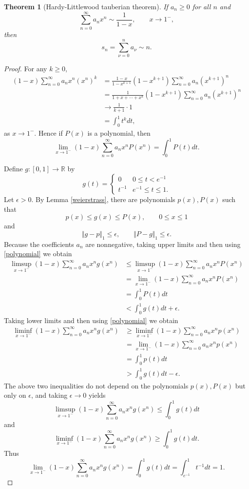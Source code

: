\documentclass{article}
\newcommand{\norm}[1]{\Vert #1 \Vert}
\newtheorem{theorem}{Theorem}
\begin{document}
\begin{theorem}[Hardy-Littlewood tauberian theorem]
If $a_n \geq 0$ for all $n$ and 
\[
\sum_{n=0}^\infty a_n x^n \sim \frac{1}{1-x}, \qquad x \to 1^-,
\]
then
\[
s_n = \sum_{\nu=0}^n a_\nu \sim n.
\]
\end{theorem}
\begin{proof}
For any $k \geq 0$,
\begin{align*}
(1-x)\sum_{n=0}^\infty a_n x^n (x^n)^k&=\frac{1-x}{1-x^{k+1}} (1-x^{k+1}) \sum_{n=0}^\infty a_n (x^{k+1})^n\\
&= \frac{1}{1+x+\cdots+x^k} (1-x^{k+1}) \sum_{n=0}^\infty a_n (x^{k+1})^n\\
&\to \frac{1}{k+1} \cdot 1\\
&= \int_0^1 t^k dt,
\end{align*}
as $x \to 1^-$. Hence if $P(x)$ is a polynomial, then
\begin{equation}
\lim_{x \to 1^-} (1-x) \sum_{n=0}^\infty a_n x^n P(x^n) = \int_0^1 P(t) dt.
\label{polynomial}
\end{equation}



Define $g:[0,1] \to \mathbb{R}$ by
\[
g(t) = 
\begin{cases}
0&0 \leq t <e^{-1}\\
t^{-1}&e^{-1} \leq t \leq 1.
\end{cases}
\]
Let $\epsilon>0$.
By Lemma \ref{weierstrass}, there are polynomials $p(x), P(x)$ such that 
\[
p(x) \leq g(x) \leq P(x), \qquad 0 \leq x \leq 1
\]
and
\[
\norm{g-p}_1 \leq \epsilon, \qquad \norm{P-g}_1 \leq \epsilon.
\]
Because the coefficients $a_n$ are nonnegative, taking upper limits and then using \eqref{polynomial} we obtain
\begin{align*}
\limsup_{x \to 1^-} (1-x)\sum_{n=0}^\infty a_n x^n g(x^n)&\leq
\limsup_{x \to 1^-} (1-x)\sum_{n=0}^\infty a_n x^n P(x^n)\\
&=\lim_{x \to 1^-} (1-x)\sum_{n=0}^\infty a_n x^n P(x^n)\\
&=\int_0^1 P(t) dt\\
&<\int_0^1 g(t) dt + \epsilon.
\end{align*}
Taking lower limits and then using \eqref{polynomial} we obtain
\begin{align*}
\liminf_{x \to 1^-} (1-x)\sum_{n=0}^\infty a_n x^n g(x^n)&\geq
\liminf_{x \to 1^-} (1-x)\sum_{n=0}^\infty a_n x^n p(x^n)\\
&=\lim_{x \to 1^-} (1-x)\sum_{n=0}^\infty a_n x^n p(x^n)\\
&=\int_0^1 p(t) dt\\
&>\int_0^1 g(t) dt - \epsilon.
\end{align*}
The above two inequalities do not depend on the polynomials $p(x),P(x)$ but only on $\epsilon$, and
taking $\epsilon \to 0$ yields
\[
\limsup_{x \to 1^-} (1-x)\sum_{n=0}^\infty a_n x^n g(x^n) \leq \int_0^1 g(t) dt
\]
and
\[
\liminf_{x \to 1^-} (1-x)\sum_{n=0}^\infty a_n x^n g(x^n) \geq \int_0^1 g(t) dt.
\]
Thus
\begin{equation}
\lim_{x \to 1^-} (1-x)\sum_{n=0}^\infty a_n x^n g(x^n) = \int_0^1 g(t) dt
= \int_{e^{-1}}^1 t^{-1} dt = 1.
\label{glimit}
\end{equation}


\end{proof}
\end{document}
